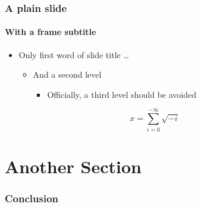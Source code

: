 \documentclass[inverse,aspectratio=169,classification=confidential]{lh-presentation}
\begin{document}
\frame{\sectionpage}

\begin{frame}[plain,classification=confidential]
  \frametitle{A plain slide}
  \framesubtitle{With a frame subtitle}


  \begin{itemize}
  \item Only first word of slide title \ldots
    \begin{itemize}
    \item  And a second level 
      \begin{itemize}
      \item  Officially, a third level should be avoided
      \end{itemize}
    \end{itemize}
  \end{itemize}
  \[ x = \sum_{i=0}^{-\infty}\sqrt{-i}\]
\end{frame}

\ThanksFrame
\CopyrightFrame
{}

\section{Another Section}
\frame{\sectionpage}
\begin{frame}
\frametitle{Conclusion}
\end{frame}
\end{document}

